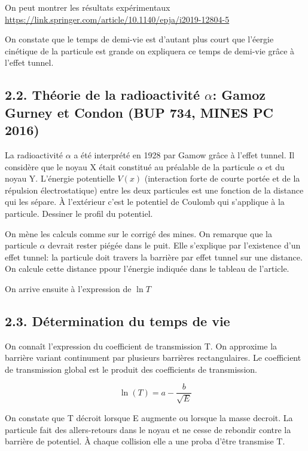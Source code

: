 \documentclass[french, a4paper, 10pt, twocolumn, landscape]{article}
\begin{document}
On peut montrer les résultats expérimentaux \url{https://link.springer.com/article/10.1140/epja/i2019-12804-5}

On constate que le temps de demi-vie est d'autant plus court que l'éergie cinétique de la particule est grande on expliquera ce temps de demi-vie grâce à l'effet tunnel.

\subsection*{2.2. Théorie de la radioactivité $\alpha$: Gamoz Gurney et Condon (BUP 734, MINES PC 2016)}


La radioactivité $\alpha $ a été interprété en 1928 par Gamow grâce à l'effet tunnel. Il considère que le noyau X était constitué au préalable de la particule $\alpha$ et du noyau Y. L'énergie potentielle $V(x)$ (interaction forte de courte portée et de la répulsion électrostatique) entre les deux particules est une fonction de la distance qui les sépare. À l'extérieur c'est le potentiel de Coulomb qui s'applique à la particule. Dessiner le profil du potentiel.\medskip

On mène les calculs comme sur le corrigé des mines. On remarque que la particule $\alpha$ devrait rester piégée dans le puit. Elle s'explique par l'existence d'un effet tunnel: la particule doit travers la barrière par effet tunnel sur une distance. On calcule cette distance ppour l'énergie indiquée dans le tableau de l'article.

On arrive ensuite à l'expression de $\ln{T}$

\subsection*{2.3. Détermination du temps de vie}

On connaît l'expression du coefficient de transmission T. On approxime la barrière variant continument par plusieurs barrières rectangulaires. Le coefficient de transmission global  est le produit des coefficients de transmission. 

\begin{equation}
    \ln(T)=a-\dfrac{b}{\sqrt{E}}
\end{equation}

On constate que T décroit lorsque E augmente ou lorsque la masse decroit. La particule fait des allers-retours dans le noyau et ne cesse de rebondir contre la barrière de potentiel. À chaque collision elle a une proba d'être transmise T. 
\end{document}
